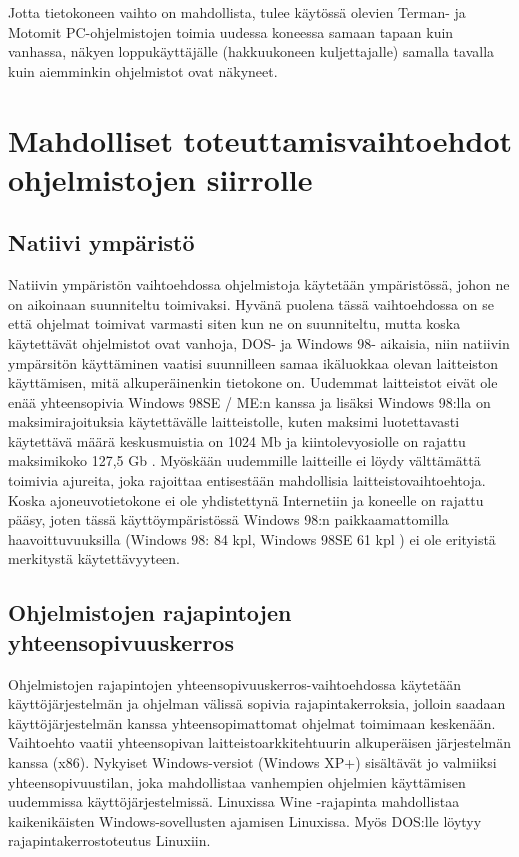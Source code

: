 \documentclass[11pt,a4paper,oneside,article]{memoir}
\begin{document}
Jotta tietokoneen vaihto on mahdollista, tulee käytössä olevien Terman- ja Motomit PC-ohjelmistojen toimia uudessa koneessa samaan tapaan kuin vanhassa, näkyen loppukäyttäjälle (hakkuukoneen kuljettajalle) samalla tavalla kuin aiemminkin ohjelmistot ovat näkyneet.

\section{Mahdolliset toteuttamisvaihtoehdot ohjelmistojen siirrolle}

\subsection{Natiivi ympäristö}

Natiivin ympäristön vaihtoehdossa ohjelmistoja käytetään ympäristössä, johon ne on aikoinaan suunniteltu toimivaksi. Hyvänä puolena tässä vaihtoehdossa on se että ohjelmat toimivat varmasti siten kun ne on suunniteltu, mutta koska käytettävät ohjelmistot ovat vanhoja, DOS- ja Windows 98- aikaisia, niin natiivin ympärsitön käyttäminen vaatisi suunnilleen samaa ikäluokkaa olevan laitteiston käyttämisen, mitä alkuperäinenkin tietokone on. Uudemmat laitteistot eivät ole enää yhteensopivia Windows 98SE / ME:n kanssa ja lisäksi Windows 98:lla on maksimirajoituksia käytettävälle laitteistolle, kuten maksimi luotettavasti käytettävä määrä keskusmuistia on 1024 Mb ja kiintolevyosiolle on rajattu maksimikoko 127,5 Gb \cite{win98:maxspecs}. Myöskään uudemmille laitteille ei löydy välttämättä toimivia ajureita, joka rajoittaa entisestään mahdollisia laitteistovaihtoehtoja. Koska ajoneuvotietokone ei ole yhdistettynä Internetiin ja koneelle on rajattu pääsy, joten tässä käyttöympäristössä Windows 98:n paikkaamattomilla haavoittuvuuksilla (Windows 98: 84 kpl, Windows 98SE 61 kpl \cite{win98:vulns}) ei ole erityistä merkitystä käytettävyyteen.

\subsection{Ohjelmistojen rajapintojen
yhteensopivuuskerros}

Ohjelmistojen rajapintojen yhteensopivuuskerros-vaihtoehdossa  käytetään käyttöjärjestelmän ja ohjelman välissä sopivia rajapintakerroksia, jolloin saadaan käyttöjärjestelmän kanssa yhteensopimattomat ohjelmat toimimaan keskenään. Vaihtoehto vaatii yhteensopivan laitteistoarkkitehtuurin alkuperäisen järjestelmän kanssa (x86). Nykyiset Windows-versiot (Windows XP+) sisältävät jo valmiiksi yhteensopivuustilan, joka mahdollistaa vanhempien ohjelmien käyttämisen uudemmissa käyttöjärjestelmissä. Linuxissa Wine -rajapinta mahdollistaa kaikenikäisten Windows-sovellusten ajamisen Linuxissa. Myös DOS:lle löytyy rajapintakerrostoteutus Linuxiin.
\end{document}
